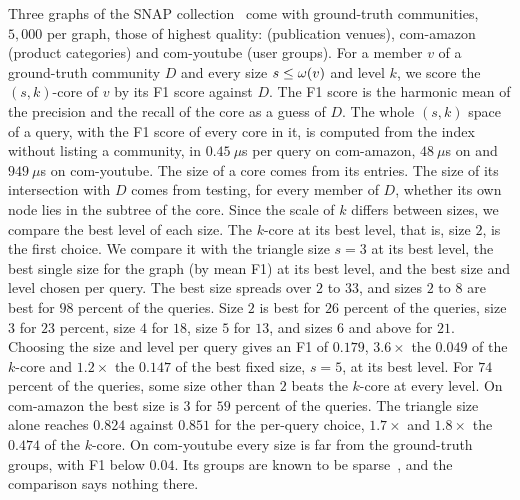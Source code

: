 Three graphs of the SNAP collection~\cite{leskovec2016snap} come with ground-truth communities, $5{,}000$ per graph, those of highest quality: \dblp (publication venues), \textsf{com-amazon} (product categories) and \textsf{com-youtube} (user groups).
%
For a member $v$ of a ground-truth community $D$ and every size $s\le\omega(v)$ and level $k$, we score the $(s,k)$-core of $v$ by its F1 score against $D$.
%
The F1 score is the harmonic mean of the precision and the recall of the core as a guess of $D$.
%
The whole $(s,k)$ space of a query, with the F1 score of every core in it, is computed from the index without listing a community, in $0.45~\mu$s per query on \textsf{com-amazon}, $48~\mu$s on \dblp and $949~\mu$s on \textsf{com-youtube}.
%
The size of a core comes from its entries.
%
The size of its intersection with $D$ comes from testing, for every member of $D$, whether its own node lies in the subtree of the core.
%
Since the scale of $k$ differs between sizes, we compare the best level of each size.
%
The $k$-core at its best level, that is, size $2$, is the first choice.
%
We compare it with the triangle size $s=3$ at its best level, the best single size for the graph (by mean F1) at its best level, and the best size and level chosen per query.
%
The best size spreads over $2$ to $33$, and sizes $2$ to $8$ are best for $98$ percent of the queries.
%
Size $2$ is best for $26$ percent of the queries, size $3$ for $23$ percent, size $4$ for $18$, size $5$ for $13$, and sizes $6$ and above for $21$.
%
Choosing the size and level per query gives an F1 of $0.179$, $3.6\times$ the $0.049$ of the $k$-core and $1.2\times$ the $0.147$ of the best fixed size, $s=5$, at its best level.
%
For $74$ percent of the queries, some size other than $2$ beats the $k$-core at every level.
%
On \textsf{com-amazon} the best size is $3$ for $59$ percent of the queries.
%
The triangle size alone reaches $0.824$ against $0.851$ for the per-query choice, $1.7\times$ and $1.8\times$ the $0.474$ of the $k$-core.
%
On \textsf{com-youtube} every size is far from the ground-truth groups, with F1 below $0.04$.
%
Its groups are known to be sparse~\cite{dblp}, and the comparison says nothing there.

